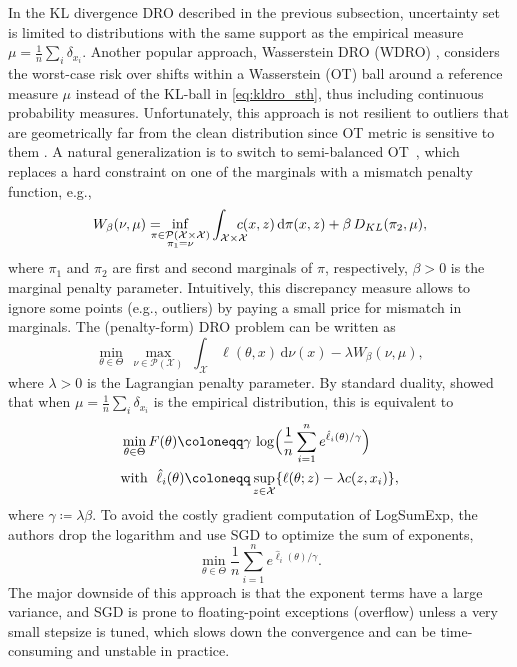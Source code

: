 \documentclass{article}
\newcommand{\dd}{\,\mathrm{d}}
\newcommand{\Pspace}{\mathcal{P}}
\newcommand*{\eqset}{\coloneqq}
\def\cX{\mathcal{X}}
\theoremstyle{plain}
\theoremstyle{definition}
\theoremstyle{remark}
\begin{document}
In the KL divergence DRO described in the previous subsection,
uncertainty set is limited to distributions with the same support as the empirical measure \(\mu=\frac{1}{n} \sum_i \delta_{x_i} \).
Another popular approach, Wasserstein DRO (WDRO) \citep{mohajerinesfahaniDatadrivenDistributionallyRobust2018,sinhaCertifyingDistributionalRobustness2020},
considers the worst-case risk over shifts within a Wasserstein (OT) ball around a reference measure \(\mu\)
instead of the KL-ball in \eqref{eq:kldro_sth},
thus including continuous probability measures.
Unfortunately, this approach is not resilient to outliers that are geometrically far from the clean distribution since
OT metric is sensitive to them \citep{nietert2023outlier}.
A natural generalization is to switch to semi-balanced OT~\citep{liero_optimal_2018,chizat_unbalanced_2019,kondratyevNewOptimalTransport2016}, which replaces a hard constraint on one of the marginals with a mismatch penalty function, e.g.,
\[
    W_\beta(\nu, \mu) = \hspace{-1em}\inf_{\substack{\pi \in \Pspace(\cX \times \cX) \\ \pi_1=\nu}} \int_{ {\cX \times \cX}} \hspace{-1em}c(x, z) \dd \pi(x,z) + \beta\, D_{KL}(\pi_2, \mu),
\]
where \(\pi_1\) and \(\pi_2\) are first and second marginals of \(\pi\), respectively,
\(\beta>0\) is the marginal penalty parameter. Intuitively, this discrepancy measure allows to ignore some points (e.g., outliers) by paying a small price for mismatch in marginals.
The (penalty-form) DRO problem can be written as
$$
    \min_{\theta \in \Theta}\, \max_{\nu \in \mathcal P(\cX)}\; \int_{ {\cX}} \ell(\theta, x)\dd \nu (x) - \lambda W_\beta(\nu, \mu),
$$
where $\lambda >0$ is the Lagrangian penalty parameter.
By standard duality,
\citet{wang2024outlier} showed that when
\(\mu=\frac{1}{n} \sum_i \delta_{x_i} \) is the empirical distribution,
this is equivalent to
\begin{align}
    &\min_{\theta \in \Theta} F(\theta) \eqset \gamma\, \log \Bigl( \frac{1}{n} \sum_{i=1}^n e^{\hat{\ell}_i(\theta) / \gamma} \Bigr)   \nonumber\\
    &\text{with }\; \hat{\ell}_i(\theta) \eqset \sup_{z \in \cX} \{ \ell (\theta; z) - \lambda c(z, x_i)\}, \label{eq:lse_dro}
\end{align}
where $\gamma \eqset \lambda \beta$.
To avoid the costly gradient computation of LogSumExp, the authors %
drop the logarithm and use SGD to optimize the sum of exponents,
\begin{equation}\label{eq:sumexp}
    \min_{\theta \in \Theta} \frac{1}{n} \sum_{i=1}^n e^{\hat{\ell}_i(\theta) / \gamma}.
\end{equation}
The major downside of this approach is that the exponent terms have a large variance, and SGD is prone to floating-point exceptions (overflow)
unless a very small stepsize is tuned, which slows down the convergence and can be time-consuming and unstable in practice.
\end{document}
